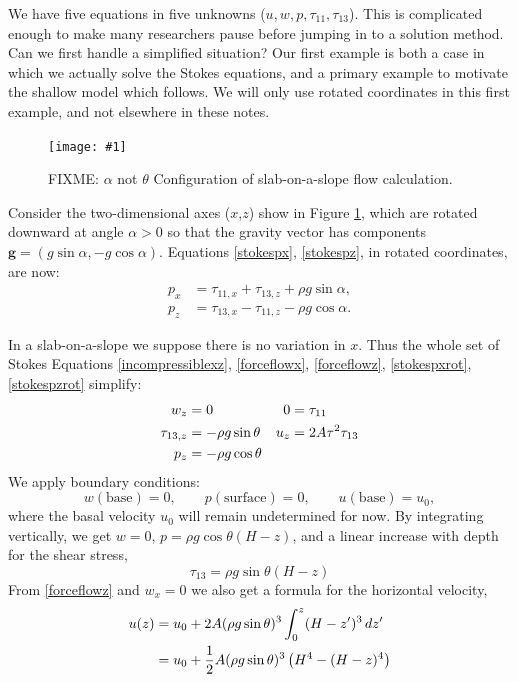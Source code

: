\documentclass[titlepage,letterpaper,final,12pt]{scrartcl}
\newcommand{\onefig}[2]{
\begin{figure}[ht]
\centering
\texttt{[image: \#1]}
\caption{#2}
\label{fig:#1}
\end{figure}}
\begin{document}
We have five equations in five unknowns ($u,w,p,\tau_{11},\tau_{13}$).  This is complicated enough to make many researchers pause before jumping in to a solution method.  Can we first handle a simplified situation?  Our first example is both a case in which we actually solve the Stokes equations, and a primary example to motivate the shallow model which follows.  We will only use rotated coordinates in this first example, and not elsewhere in these notes.

\onefig{slab}{FIXME: $\alpha$ not $\theta$  Configuration of slab-on-a-slope flow calculation.}

Consider the two-dimensional axes ($x$,$z$) show in Figure \ref{fig:slab}, which are rotated downward at angle $\alpha>0$ so that the gravity vector has components $\mathbf{g} = (g \sin\alpha,- g \cos \alpha)$.  Equations \eqref{stokespx}, \eqref{stokespz}, in rotated coordinates, are now:
\begin{align}
p_x &= \tau_{11,x} + \tau_{13,z} + \rho g \sin\alpha, \label{stokespxrot} \\
p_z &= \tau_{13,x} - \tau_{11,z} - \rho g \cos\alpha. \label{stokespzrot}
\end{align}

In a slab-on-a-slope we suppose there is no variation in $x$.  Thus the whole set of Stokes Equations \eqref{incompressiblexz}, \eqref{forceflowx}, \eqref{forceflowz}, \eqref{stokespxrot}, \eqref{stokespzrot} simplify:
\begin{align}
w_z &= 0 &   0 &= \tau_{11} \label{slabblock} \\
\tau_{13,z} &= - \rho g \sin\theta &   u_z &= 2 A \tau^2 \tau_{13} \notag \\
p_z &= - \rho g \cos\theta \notag
\end{align}
We apply boundary conditions:
	$$w(\text{base})=0, \qquad p(\text{surface})=0, \qquad u(\text{base})=u_0,$$
where the basal velocity $u_0$ will remain undetermined for now.  By integrating vertically, we get $w=0$, $p = \rho g \cos\theta (H-z)$, and a linear increase with depth for the shear stress,
	$$\tau_{13} = \rho g \sin\theta (H-z)$$
From \eqref{forceflowz} and $w_x=0$ we also get a formula for the horizontal velocity,
\begin{align}
u(z) &= u_0 + 2 A (\rho g \sin\theta)^3 \int_0^z (H-z')^3\,dz' \label{uslab} \\
     &= u_0 + \frac{1}{2} A (\rho g \sin\theta)^3  \left(H^4 - (H-z)^4\right) \notag
\end{align}
\end{document}
